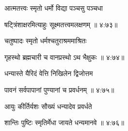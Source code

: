 {\devanagarifont आत्मतत्त्वः स्मृतो धर्मो विद्या पञ्चसु पञ्चधा \thinspace{\dandab} \dontdisplaylinenum }%


{\devanagarifont षट्त्रिंशाक्षरमित्याहुः सूक्ष्मतत्त्वमलक्षणम् {॥ ४:७३॥} \veg\dontdisplaylinenum }%

{\devanagarifont चतुष्पादः स्मृतो धर्मश्चतुराश्रममाश्रितः \thinspace{\dandab} \dontdisplaylinenum }%


{\devanagarifont गृहस्थो ब्रह्मचारी च वानप्रस्थो ऽथ भैक्षुकः {॥ ४:७४॥} \veg\dontdisplaylinenum }%

{\devanagarifont धन्यास्ते यैरिदं वेत्ति निखिलेन द्विजोत्तम \thinspace{\dandab} \dontdisplaylinenum }%


{\devanagarifont पावनं सर्वपापानां पुण्यानां च प्रवर्धनम् {॥ ४:७५॥} \veg\dontdisplaylinenum }%

{\devanagarifont आयुः कीर्तिर्यशः सौख्यं धन्यादेव प्रवर्धते \thinspace{\dandab} \dontdisplaylinenum }%


{\devanagarifont शान्तिः पुष्टिः स्मृतिर्मेधा जायते धन्यमानवे {॥ ४:७६॥} \veg\dontdisplaylinenum }%


